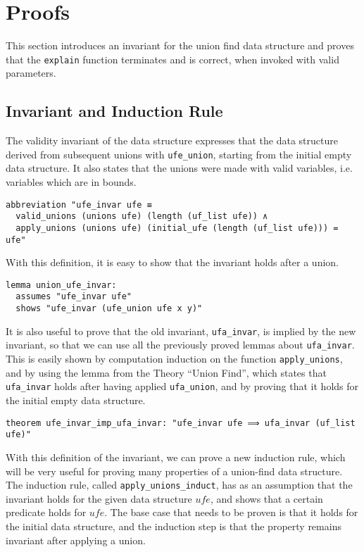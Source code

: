 \section{Proofs}

This section introduces an invariant for the union find data structure and proves that the \lstinline{explain} function terminates and is correct, when invoked with valid parameters.

\subsection{Invariant and Induction Rule}

The validity invariant of the data structure expresses that the data structure derived from subsequent unions with \lstinline{ufe_union}, starting from the initial empty data structure.
It also states that the unions were made with valid variables, i.e. variables which are in bounds.

\begin{lstlisting}
abbreviation "ufe_invar ufe ≡
  valid_unions (unions ufe) (length (uf_list ufe)) ∧
  apply_unions (unions ufe) (initial_ufe (length (uf_list ufe))) = ufe"
\end{lstlisting}

With this definition, it is easy to show that the invariant holds after a union.

\begin{lstlisting}
lemma union_ufe_invar:
  assumes "ufe_invar ufe"
  shows "ufe_invar (ufe_union ufe x y)"
\end{lstlisting}

It is also useful to prove that the old invariant, \lstinline{ufa_invar}, is implied by the new invariant, so that we can use all the previously proved lemmas about \lstinline{ufa_invar}. This is easily shown by computation induction on the function \lstinline{apply_unions}, and by using the lemma from the Theory ``Union Find'', which states that \lstinline{ufa_invar} holds after having applied \lstinline{ufa_union}, and by proving that it holds for the initial empty data structure.

\begin{lstlisting}
theorem ufe_invar_imp_ufa_invar: "ufe_invar ufe ⟹ ufa_invar (uf_list ufe)"
\end{lstlisting}

With this definition of the invariant, we can prove a new induction rule, which will be very useful for proving many properties of a union-find data structure. The induction rule, called \lstinline{apply_unions_induct}, has as an assumption that the invariant holds for the given data structure $ufe$, and shows that a certain predicate holds for $ufe$. The base case that needs to be proven is that it holds for the initial data structure, and the induction step is that the property remains invariant after applying a union.

